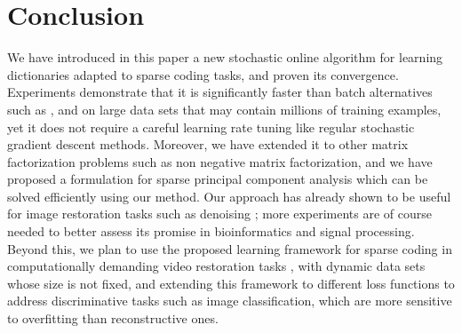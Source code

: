 \documentclass[twoside,11pt]{article}
\begin{document}
\section{Conclusion}
We have introduced in this paper a new stochastic online algorithm for learning
dictionaries adapted to sparse coding tasks, and proven its convergence.
Experiments demonstrate that it is significantly faster than batch alternatives
such as \citet{engan}, \citet{aharon} and \citet{lee}
on large data sets that may contain millions of training examples, yet it does not
require a careful learning rate tuning like regular stochastic gradient descent
methods.  Moreover, we have extended it to other matrix factorization problems
such as non negative matrix factorization, and we have proposed a formulation
for sparse principal component analysis which can be solved efficiently using
our method. Our approach has already shown to be useful for
image restoration tasks such as denoising \citep{mairal8};
more experiments are of course needed to better assess its promise
in bioinformatics and signal processing.
Beyond this, we plan to use the proposed learning framework for
sparse coding in computationally demanding video restoration
tasks \citep{protter}, with dynamic data sets whose size is not fixed, and
extending this framework to different loss functions \citep{mairal6} to address
discriminative tasks such as image classification, which are more sensitive to
overfitting than reconstructive ones.
\appendix
\end{document}
